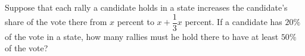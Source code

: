 Suppose that each rally a candidate holds in a state increases the candidate's share of the vote there from $x$ percent to $x+\dfrac13x$ percent. If a candidate has $20\%$ of the vote in a state, how many rallies must he hold there to have at least $50\%$ of the vote?
